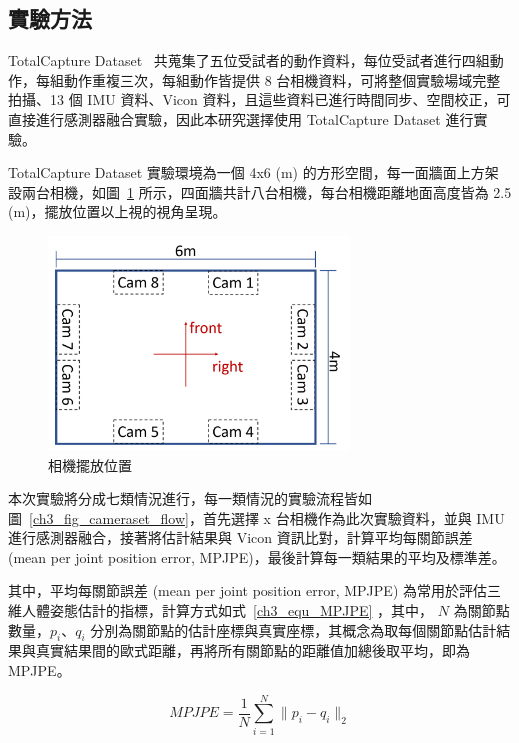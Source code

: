 \subsection{實驗方法}
TotalCapture Dataset~\cite{Trumble:BMVC:2017} 共蒐集了五位受試者的動作資料，每位受試者進行四組動作，每組動作重複三次，每組動作皆提供 8 台相機資料，可將整個實驗場域完整拍攝、13 個 IMU 資料、Vicon 資料，且這些資料已進行時間同步、空間校正，可直接進行感測器融合實驗，因此本研究選擇使用 TotalCapture Dataset 進行實驗。

TotalCapture Dataset 實驗環境為一個 4x6 (m) 的方形空間，每一面牆面上方架設兩台相機，如圖~\ref{ch3_fig_cameraset_totalcap} 所示，四面牆共計八台相機，每台相機距離地面高度皆為 2.5 (m)，擺放位置以上視的視角呈現。

\begin{figure}[!ht]
   \centering
   \includegraphics[width=8cm]{figure/ch3_fig_cameraset_totalcap.png}
    \caption[相機擺放位置]{相機擺放位置}
    \label{ch3_fig_cameraset_totalcap}
\end{figure}

本次實驗將分成七類情況進行，每一類情況的實驗流程皆如圖~\ref{ch3_fig_cameraset_flow}，首先選擇 x 台相機作為此次實驗資料，並與 IMU 進行感測器融合，接著將估計結果與 Vicon 資訊比對，計算平均每關節誤差 (mean per joint position error, MPJPE)，最後計算每一類結果的平均及標準差。

其中，平均每關節誤差 (mean per joint position error, MPJPE) 為常用於評估三維人體姿態估計的指標，計算方式如式~\ref{ch3_equ_MPJPE} ，其中， $N$ 為關節點數量，$p_i$、$q_i$ 分別為關節點的估計座標與真實座標，其概念為取每個關節點估計結果與真實結果間的歐式距離，再將所有關節點的距離值加總後取平均，即為 MPJPE。

\begin{equation}
    MPJPE = \frac{1}{N} \sum_{i=1}^{N} \parallel p_i - q_i \parallel_2
    \label{ch3_equ_MPJPE}
\end{equation}

